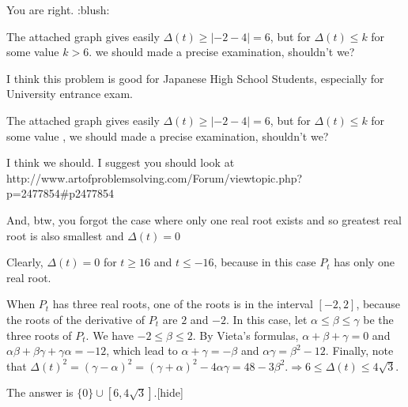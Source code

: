 \begin{solution}
	You are right. :blush: 

The attached graph gives easily $\Delta(t)\geq |-2-4|=6$, but for $\Delta(t)\leq k$ for some value $k>6$.
we should made a precise examination, shouldn't we?

I think this problem is good for Japanese High School Students, especially for University entrance exam.
\end{solution}



\begin{solution}
	\begin{tcolorbox} The attached graph gives easily $\Delta(t)\geq |-2-4|=6$, but for $\Delta(t)\leq k$ for some value , 
we should made a precise examination, shouldn't we?\end{tcolorbox}
I think we should.
I suggest you should look at http://www.artofproblemsolving.com/Forum/viewtopic.php?p=2477854#p2477854

And, btw, you forgot the case where only one real root exists and so greatest real root is also smallest and $\Delta(t)=0$
\end{solution}



\begin{solution}

Clearly, $\Delta(t)=0$ for $t\geq 16 $ and $t\leq -16$, because in this case $P_t$ has only one real root.

When $P_t$ has three real roots, one of the roots is in the interval $[-2,2]$, because the roots of the derivative of $P_t$ are $2$ and $-2$.
In this case, let $\alpha\leq\beta\leq\gamma$ be the three roots of $P_t$. We have $-2\leq\beta\leq2$.
By Vieta's formulas, $\alpha+\beta+\gamma=0$ and $\alpha\beta+\beta\gamma+\gamma\alpha=-12$, which lead to $\alpha+\gamma=-\beta$ and $\alpha\gamma=\beta^2-12$.
Finally, note that $\Delta(t)^2=(\gamma-\alpha)^2=(\gamma+\alpha)^2-4\alpha\gamma=48-3\beta^2. \Rightarrow 6\leq\Delta(t)\leq4\sqrt{3}.$

The answer is $\{0\} \cup [6,4\sqrt{3}].$[\/hide]
\end{solution}



